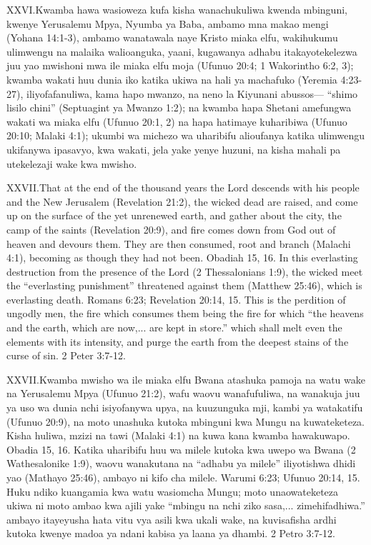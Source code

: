 \lettrine{XXVI.} Kwamba hawa wasioweza kufa kisha wanachukuliwa kwenda mbinguni, kwenye Yerusalemu Mpya, Nyumba ya Baba, ambamo mna makao mengi (Yohana 14:1-3), ambamo wanatawala naye Kristo miaka elfu, wakihukumu ulimwengu na malaika walioanguka, yaani, kugawanya adhabu itakayotekelezwa juu yao mwishoni mwa ile miaka elfu moja (Ufunuo 20:4; 1 Wakorintho 6:2, 3); kwamba wakati huu dunia iko katika ukiwa na hali ya machafuko (Yeremia 4:23-27), iliyofafanuliwa, kama hapo mwanzo, na neno la Kiyunani abussos— “shimo lisilo chini” (Septuagint ya Mwanzo 1:2); na kwamba hapa Shetani amefungwa wakati wa miaka elfu (Ufunuo 20:1, 2) na hapa hatimaye kuharibiwa (Ufunuo 20:10; Malaki 4:1); ukumbi wa michezo wa uharibifu alioufanya katika ulimwengu ukifanywa ipasavyo, kwa wakati, jela yake yenye huzuni, na kisha mahali pa utekelezaji wake kwa mwisho.


\lettrine{XXVII.} That at the end of the thousand years the Lord descends with his people and the New Jerusalem (Revelation 21:2), the wicked dead are raised, and come up on the surface of the yet unrenewed earth, and gather about the city, the camp of the saints (Revelation 20:9), and fire comes down from God out of heaven and devours them. They are then consumed, root and branch (Malachi 4:1), becoming as though they had not been. Obadiah 15, 16. In this everlasting destruction from the presence of the Lord (2 Thessalonians 1:9), the wicked meet the “everlasting punishment” threatened against them (Matthew 25:46), which is everlasting death. Romans 6:23; Revelation 20:14, 15. This is the perdition of ungodly men, the fire which consumes them being the fire for which “the heavens and the earth, which are now,... are kept in store.” which shall melt even the elements with its intensity, and purge the earth from the deepest stains of the curse of sin. 2 Peter 3:7-12.


\lettrine{XXVII.} Kwamba mwisho wa ile miaka elfu Bwana atashuka pamoja na watu wake na Yerusalemu Mpya (Ufunuo 21:2), wafu waovu wanafufuliwa, na wanakuja juu ya uso wa dunia nchi isiyofanywa upya, na kuuzunguka mji, kambi ya watakatifu (Ufunuo 20:9), na moto unashuka kutoka mbinguni kwa Mungu na kuwateketeza. Kisha huliwa, mzizi na tawi (Malaki 4:1) na kuwa kana kwamba hawakuwapo. Obadia 15, 16. Katika uharibifu huu wa milele kutoka kwa uwepo wa Bwana (2 Wathesalonike 1:9), waovu wanakutana na “adhabu ya milele” iliyotishwa dhidi yao (Mathayo 25:46), ambayo ni kifo cha milele. Warumi 6:23; Ufunuo 20:14, 15. Huku ndiko kuangamia kwa watu wasiomcha Mungu; moto unaowateketeza ukiwa ni moto ambao kwa ajili yake “mbingu na nchi ziko sasa,... zimehifadhiwa.” ambayo itayeyusha hata vitu vya asili kwa ukali wake, na kuvisafisha ardhi kutoka kwenye madoa ya ndani kabisa ya laana ya dhambi. 2 Petro 3:7-12.


